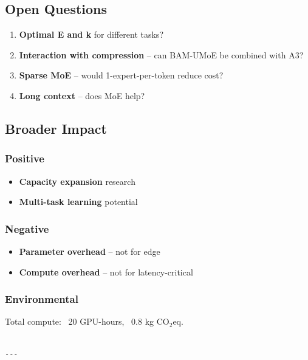 \subsection{Open Questions}

\begin{enumerate}
\item \textbf{Optimal E and k} for different tasks?
\item \textbf{Interaction with compression} -- can BAM-UMoE be combined with A3?
\item \textbf{Sparse MoE} -- would 1-expert-per-token reduce cost?
\item \textbf{Long context} -- does MoE help?

\end{enumerate}
\subsection{Broader Impact}

\subsubsection{Positive}
\begin{itemize}
\item \textbf{Capacity expansion} research
\item \textbf{Multi-task learning} potential

\end{itemize}
\subsubsection{Negative}
\begin{itemize}
\item \textbf{Parameter overhead} -- not for edge
\item \textbf{Compute overhead} -- not for latency-critical

\end{itemize}
\subsubsection{Environmental}
Total compute: ~20 GPU-hours, ~0.8 kg CO$_2$eq.
\begin{lstlisting}

---
\end{lstlisting}